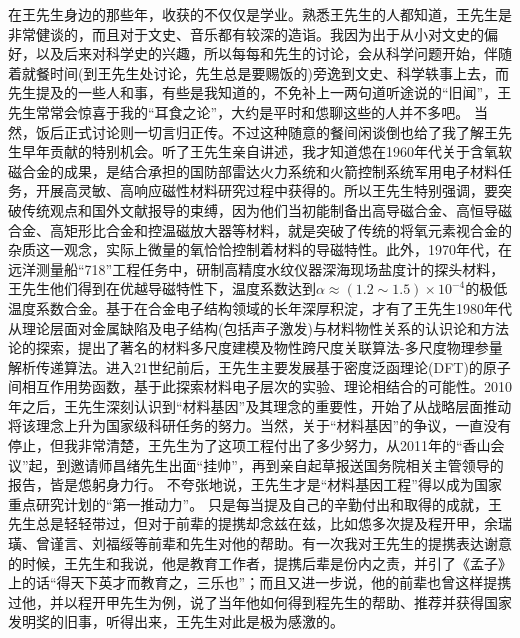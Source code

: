 在王先生身边的那些年，收获的不仅仅是学业。熟悉王先生的人都知道，王先生是非常健谈的，而且对于文史、音乐都有较深的造诣。我因为出于从小对文史的偏好，以及后来对科学史的兴趣，所以每每和先生的讨论，会从科学问题开始，伴随着就餐时间(到王先生处讨论，先生总是要赐饭的)旁逸到文史、科学轶事上去，而先生提及的一些人和事，有些是我知道的，不免补上一两句道听途说的``旧闻''，王先生常常会惊喜于我的``耳食之论''，大约是平时和怹聊这些的人并不多吧。%
当然，饭后正式讨论则一切言归正传。不过这种随意的餐间闲谈倒也给了我了解王先生早年贡献的特别机会。听了王先生亲自讲述，我才知道怹在1960年代关于含氧软磁合金的成果，是结合承担的国防部雷达火力系统和火箭控制系统军用电子材料任务，开展高灵敏、高响应磁性材料研究过程中获得的。所以王先生特别强调，要突破传统观点和国外文献报导的束缚，因为他们当初能制备出高导磁合金、高恒导磁合金、高矩形比合金和控温磁放大器等材料，就是突破了传统的将氧元素视合金的杂质这一观念，实际上微量的氧恰恰控制着材料的导磁特性。此外，1970年代，在远洋测量船``718''工程任务中，研制高精度水纹仪器深海现场盐度计的探头材料，王先生他们得到在优越导磁特性下，温度系数达到$\alpha\approx(1.2\sim 1.5)\times10^{-4}$的极低温度系数合金。基于在合金电子结构领域的长年深厚积淀，才有了王先生1980年代从理论层面对金属缺陷及电子结构(包括声子激发)与材料物性关系的认识论和方法论的探索，提出了著名的材料多尺度建模及物性跨尺度关联算法-多尺度物理参量解析传递算法。进入21世纪前后，王先生主要发展基于密度泛函理论\textrm{(DFT)}的原子间相互作用势函数，基于此探索材料电子层次的实验、理论相结合的可能性。2010年之后，王先生深刻认识到``材料基因''及其理念的重要性，开始了从战略层面推动将该理念上升为国家级科研任务的努力。当然，关于``材料基因''的争议，一直没有停止，但我非常清楚，王先生为了这项工程付出了多少努力，从2011年的``香山会议''起，到邀请师昌绪先生出面``挂帅''，再到亲自起草报送国务院相关主管领导的报告，皆是怹躬身力行。%
不夸张地说，王先生才是``材料基因工程''得以成为国家重点研究计划的``第一推动力''。%
只是每当提及自己的辛勤付出和取得的成就，王先生总是轻轻带过，但对于前辈的提携却念兹在兹，比如怹多次提及程开甲，余瑞璜、曾谨言、刘福绥等前辈和先生对他的帮助。有一次我对王先生的提携表达谢意的时候，王先生和我说，他是教育工作者，提携后辈是份内之责，并引了《孟子》上的话``得天下英才而教育之，三乐也''；而且又进一步说，他的前辈也曾这样提携过他，并以程开甲先生为例，说了当年他如何得到程先生的帮助、推荐并获得国家发明奖的旧事，听得出来，王先生对此是极为感激的。%


